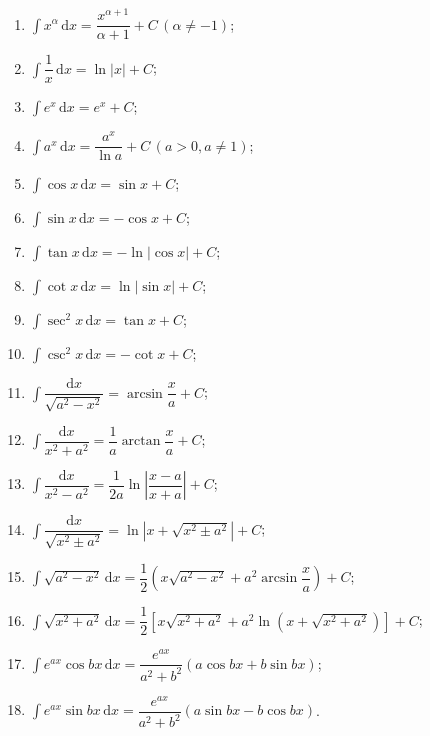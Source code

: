 \begin{theorem}
    \leavevmode
    \begin{enumerate}
        \item $\displaystyle\int x^\alpha\,\mathrm{d}x=\dfrac{x^{\alpha+1}}{\alpha+1}+C\,(\alpha\neq-1)$;
        \item $\displaystyle\int\dfrac{1}{x}\,\mathrm{d}x=\ln|x|+C$;
        \item $\displaystyle\int e^x\,\mathrm{d}x=e^x+C$;
        \item $\displaystyle\int a^x\,\mathrm{d}x=\dfrac{a^x}{\ln a}+C\,(a>0,a\neq1)$;
        \item $\displaystyle\int\cos x\,\mathrm{d}x=\sin x+C$;
        \item $\displaystyle\int\sin x\,\mathrm{d}x=-\cos x+C$;
        \item $\displaystyle\int\tan x\,\mathrm{d}x=-\ln|\cos x|+C$;
        \item $\displaystyle\int\cot x\,\mathrm{d}x=\ln|\sin x|+C$;
        \item $\displaystyle\int\sec^2x\,\mathrm{d}x=\tan x+C$;
        \item $\displaystyle\int\csc^2x\,\mathrm{d}x=-\cot x+C$;
        \item $\displaystyle\int\dfrac{\mathrm{d}x}{\sqrt{a^2-x^2}}=\arcsin\dfrac{x}{a}+C$;
        \item $\displaystyle\int\dfrac{\mathrm{d}x}{x^2+a^2}=\dfrac{1}{a}\arctan\dfrac{x}{a}+C$;
        \item $\displaystyle\int\dfrac{\mathrm{d}x}{x^2-a^2}=\dfrac{1}{2a}\ln\left|\dfrac{x-a}{x+a}\right|+C$;
        \item $\displaystyle\int\dfrac{\mathrm{d}x}{\sqrt{x^2\pm a^2}}=\ln\left|x+\sqrt{x^2\pm a^2}\right|+C$;
        \item $\displaystyle\int\sqrt{a^2-x^2}\,\mathrm{d}x
                  =\dfrac{1}{2}\left(x\sqrt{a^2-x^2}+a^2\arcsin\dfrac{x}{a}\right)+C$;
        \item $\displaystyle\int\sqrt{x^2+a^2}\,\mathrm{d}x
                  =\dfrac{1}{2}\left[x\sqrt{x^2+a^2}+a^2\ln\left(x+\sqrt{x^2+a^2}\right)\right]+C$;
        \item $\displaystyle\int e^{ax}\cos bx\,\mathrm{d}x
                  =\dfrac{e^{ax}}{a^2+b^2}(a\cos bx+b\sin bx)$;
        \item $\displaystyle\int e^{ax}\sin bx\,\mathrm{d}x
                  =\dfrac{e^{ax}}{a^2+b^2}(a\sin bx-b\cos bx)$.
    \end{enumerate}
\end{theorem}

